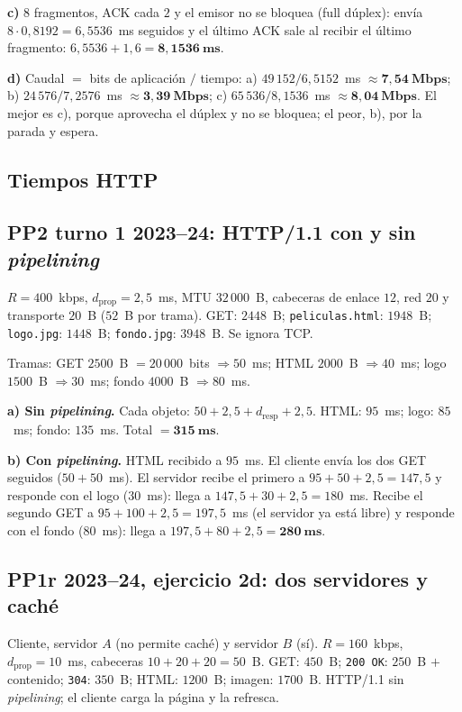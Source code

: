 \documentclass[11pt,a4paper]{article}
\begin{document}
\textbf{c)} $8$ fragmentos, ACK cada $2$ y el emisor no se bloquea (full dúplex): envía $8\cdot0{,}8192=6{,}5536$~ms seguidos y el último ACK sale al recibir el último fragmento: $6{,}5536+1{,}6=\mathbf{8{,}1536~ms}$.

\textbf{d)} Caudal $=$ bits de aplicación $/$ tiempo: a) $49\,152/6{,}5152$~ms $\approx\mathbf{7{,}54~Mbps}$; b) $24\,576/7{,}2576$~ms $\approx\mathbf{3{,}39~Mbps}$; c) $65\,536/8{,}1536$~ms $\approx\mathbf{8{,}04~Mbps}$. El mejor es c), porque aprovecha el dúplex y no se bloquea; el peor, b), por la parada y espera.

\subsection{Tiempos HTTP}

\subsection*{PP2 turno 1 2023--24: HTTP/1.1 con y sin \emph{pipelining}}
$R=400$~kbps, $d_{\text{prop}}=2{,}5$~ms, MTU $32\,000$~B, cabeceras de enlace $12$, red $20$ y transporte $20$~B ($52$~B por trama). GET: $2448$~B; \texttt{peliculas.html}: $1948$~B; \texttt{logo.jpg}: $1448$~B; \texttt{fondo.jpg}: $3948$~B. Se ignora TCP.

Tramas: GET $2500$~B $=20\,000$~bits $\Rightarrow50$~ms; HTML $2000$~B $\Rightarrow40$~ms; logo $1500$~B $\Rightarrow30$~ms; fondo $4000$~B $\Rightarrow80$~ms.

\textbf{a) Sin \emph{pipelining}.} Cada objeto: $50+2{,}5+d_{\text{resp}}+2{,}5$.
HTML: $95$~ms; logo: $85$~ms; fondo: $135$~ms. Total $=\mathbf{315~ms}$.

\textbf{b) Con \emph{pipelining}.} HTML recibido a $95$~ms. El cliente envía los dos GET seguidos ($50+50$~ms). El servidor recibe el primero a $95+50+2{,}5=147{,}5$ y responde con el logo ($30$~ms): llega a $147{,}5+30+2{,}5=180$~ms. Recibe el segundo GET a $95+100+2{,}5=197{,}5$~ms (el servidor ya está libre) y responde con el fondo ($80$~ms): llega a $197{,}5+80+2{,}5=\mathbf{280~ms}$.

\subsection*{PP1r 2023--24, ejercicio 2d: dos servidores y caché}
Cliente, servidor $A$ (no permite caché) y servidor $B$ (sí). $R=160$~kbps, $d_{\text{prop}}=10$~ms, cabeceras $10+20+20=50$~B. GET: $450$~B; \texttt{200 OK}: $250$~B $+$ contenido; \texttt{304}: $350$~B; HTML: $1200$~B; imagen: $1700$~B. HTTP/1.1 sin \emph{pipelining}; el cliente carga la página y la refresca.
\end{document}

